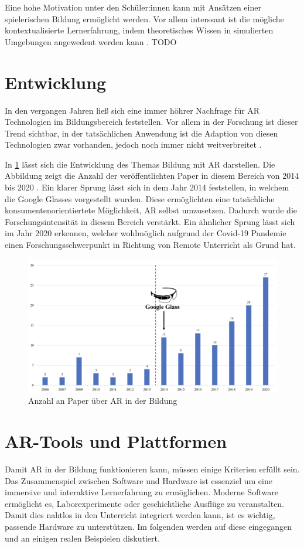 \documentclass[conference]{IEEEtran}
\begin{document}
Eine hohe Motivation unter den Schüler:innen 
kann mit Ansätzen einer spielerischen Bildung ermöglicht werden. Vor allem interssant ist 
die mögliche kontextualisierte Lernerfahrung, indem theoretisches Wissen in simulierten 
Umgebungen angewedent werden kann \cite{b2}. TODO

\section{Entwicklung}
In den vergangen Jahren ließ sich eine immer höhrer Nachfrage für AR Technologien im Bildungsbereich
feststellen. Vor allem in der Forschung ist dieser Trend sichtbar, in der tatsächlichen Anwendung ist die
Adaption von diesen Technologien zwar vorhanden, jedoch noch immer nicht weitverbreitet \cite{b3}.

In \ref{fig1} lässt sich die Entwicklung des Themas Bildung mit AR darstellen. Die Abbildung zeigt die Anzahl
der veröffentlichten Paper in diesem Bereich von 2014 bis 2020 \cite{w2}. Ein klarer Sprung lässt sich in dem Jahr 2014 feststellen,
in welchem die Google Glasses vorgestellt wurden. Diese ermöglichten eine tatsächliche konsumentenorientiertete 
Möglichkeit, AR selbst umzusetzen. Dadurch wurde die Forschungsintensität in diesem Bereich verstärkt. 
Ein ähnlicher Sprung lässt sich im Jahr 2020 erkennen, welcher wohlmöglich aufgrund der Covid-19 Pandemie einen
Forschungsschwerpunkt in Richtung von Remote Unterricht als Grund hat.

\begin{figure}[htbp]
    \centerline{\includegraphics[scale=0.2]{img/entwicklung.png}}
    \caption{Anzahl an Paper über AR in der Bildung}
    \label{fig1}
\end{figure}

\section{AR-Tools und Plattformen}\label{AA}
Damit AR in der Bildung funktionieren kann, müssen einige Kriterien erfüllt sein. Das Zusammenspiel
zwischen Software und Hardware ist essenziel um eine immersive und interaktive Lernerfahrung
zu ermöglichen. Moderne Software ermöglicht es, Laborexperimente oder geschichtliche Ausflüge
zu veranstalten. Damit dies nahtlos in den Unterricht integriert werden kann, ist es wichtig, passende
Hardware zu unterstützen.
Im folgenden werden auf diese eingegangen und an einigen realen Beispielen diskutiert.
\end{document}
